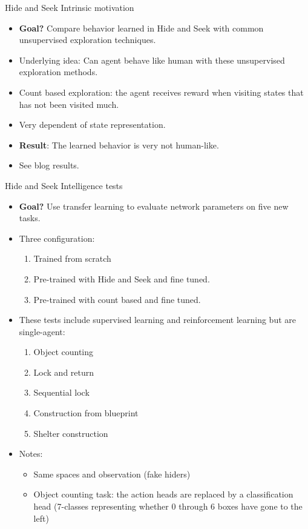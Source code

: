 \documentclass{beamer}
\begin{document}
\begin{frame}{Hide and Seek Intrinsic motivation}
    \begin{itemize}
        \item \textbf{Goal?} Compare behavior learned in Hide and Seek with common unsupervised exploration techniques.
        \vfill
        \item Underlying idea: Can agent behave like human with these unsupervised exploration methods.
        \vfill
        \item Count based exploration: the agent receives reward when visiting states that has not been visited much.
        \vfill
        \item Very dependent of state representation.
        \vfill
        \item \textbf{Result}: The learned behavior is very not human-like.
        \vfill
        \item See blog results.
    \end{itemize}{}
\end{frame}{}

\begin{frame}{Hide and Seek Intelligence tests}
    \begin{itemize}
        \item \textbf{Goal?} Use transfer learning to evaluate network parameters on five new tasks.
        \item Three configuration:
        \begin{enumerate}
            \item Trained from scratch
            \item Pre-trained with Hide and Seek and fine tuned.
            \item Pre-trained with count based and fine tuned.
        \end{enumerate}{}
        \item These tests include supervised learning and reinforcement learning but are single-agent: 
        \begin{enumerate}
            \item Object counting
            \item Lock and return
            \item Sequential lock
            \item Construction from blueprint
            \item Shelter construction
        \end{enumerate}{}
        \item Notes:
        \begin{itemize}
        \item Same spaces and observation (fake hiders)
        \item Object counting task: the action heads are replaced by a classification head (7-classes representing whether 0 through 6 boxes have gone to the left)
        \end{itemize}{}
    \end{itemize}{}
\end{frame}{}
\end{document}
